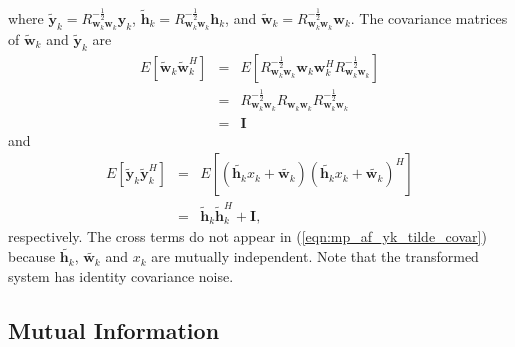 where $\tilde{\mathbf{y}}_k = R_{\mathbf{w}_k\mathbf{w}_k}^{-\frac{1}{2}} \mathbf{y}_k$, $\tilde{\mathbf{h}}_k =R_{\mathbf{w}_k\mathbf{w}_k}^{-\frac{1}{2}} \mathbf{h}_k$, and $\tilde{\mathbf{w}}_k = R_{\mathbf{w}_k\mathbf{w}_k}^{-\frac{1}{2}} \mathbf{w}_k$.  The covariance matrices of $\tilde{\mathbf{w}}_k$ and $\tilde{\mathbf{y}}_k$ are
\begin{eqnarray}
E \left[ \tilde{\mathbf{w}}_k \tilde{\mathbf{w}}_k^H \right] & = & E \left[R_{\mathbf{w}_k\mathbf{w}_k}^{-\frac{1}{2}} \mathbf{w}_k \mathbf{w}_k^H R_{\mathbf{w}_k\mathbf{w}_k}^{-\frac{1}{2}} \right] \\
& = & R_{\mathbf{w}_k\mathbf{w}_k}^{-\frac{1}{2}} R_{\mathbf{w}_k\mathbf{w}_k}R_{\mathbf{w}_k\mathbf{w}_k}^{-\frac{1}{2}} \\
& = & \mathbf{I} 
\end{eqnarray}
and
\begin{eqnarray}
E \left[ \tilde{\mathbf{y}}_k \tilde{\mathbf{y}}_k^H \right] & = & E \left[ \left(\tilde{\mathbf{h}_k}x_k + \tilde{\mathbf{w}_k}\right) \left(\tilde{\mathbf{h}_k}x_k + \tilde{\mathbf{w}_k}\right)^H \right] 
\\
& = & \tilde{\mathbf{h}}_k \tilde{\mathbf{h}}_k^H + \mathbf{I},
\label{eqn:mp_af_yk_tilde_covar}
\end{eqnarray}
respectively.  The cross terms do not appear in (\ref{eqn:mp_af_yk_tilde_covar}) because $\tilde{\mathbf{h}_k}$, $\tilde{\mathbf{w}_k}$ and $x_k$ are mutually independent.  Note that the transformed system has identity covariance noise.

\subsection{Mutual Information}
\label{subsec:mp_af_mi}

